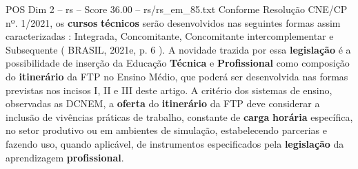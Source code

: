 \begin{textsample}{POS Dim 2 – rs – Score 36.00 – rs/rs\_em\_85.txt}
Conforme Resolução CNE/CP nº. 1/2021, os \textbf{cursos} \textbf{técnicos} serão desenvolvidos nas seguintes formas assim caracterizadas : Integrada, Concomitante, Concomitante intercomplementar e Subsequente ( BRASIL, 2021e, p. 6 ).
A novidade trazida por essa \textbf{legislação} é a possibilidade de inserção da Educação \textbf{Técnica} e \textbf{Profissional} como composição do \textbf{itinerário} da FTP no Ensino Médio, que poderá ser desenvolvida nas formas previstas nos incisos I, II e III deste artigo.
A critério dos sistemas de ensino, observadas as DCNEM, a \textbf{oferta} do \textbf{itinerário} da FTP deve considerar a inclusão de vivências práticas de trabalho, constante de \textbf{carga} \textbf{horária} específica, no setor produtivo ou em ambientes de simulação, estabelecendo parcerias e fazendo uso, quando aplicável, de instrumentos especificados pela \textbf{legislação} da aprendizagem \textbf{profissional}.

\end{textsample}
